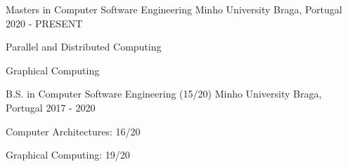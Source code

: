 


\begin{cventries}


\cventry
  {Masters in Computer Software Engineering} %
{Minho University} %
{Braga, Portugal} %
{2020 - PRESENT} %
{ %
\begin{cvitems}
\item {Parallel and Distributed Computing}
\item{Graphical Computing}
\end{cvitems}
}


\cventry
  {B.S. in Computer Software Engineering (15/20)} %
{Minho University} %
{Braga, Portugal} %
{2017 - 2020} %
{ %
\begin{cvitems}
\item {Computer Architectures: 16/20}
\item {Graphical Computing: 19/20}
\end{cvitems}
}



\end{cventries}
